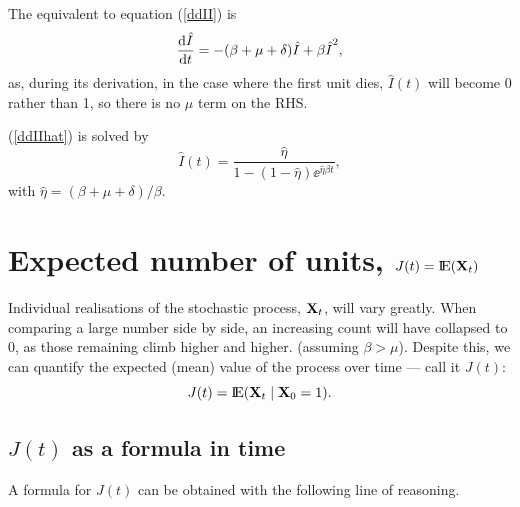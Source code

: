 The equivalent to equation (\ref{ddII}) is
\begin{equation}
\label{ddIIhat}
\displaystyle\frac{{\rm d} \hat I}{{\rm d} t} =  -(\beta + \mu + \delta)\hat I + \beta {\hat I}^2,
\end{equation}
as, during its derivation, in the case where the first unit dies, $\hat I(t)$ will become 0 rather than 1, so there is no $\mu$ term on the RHS.

(\ref{ddIIhat}) is solved by
$$\hat I(t) = \frac{\hat\eta}{1 - (1-\hat\eta)\ee^{\hat\eta\beta t}}, $$
with $\hat\eta = (\beta + \mu + \delta)/\beta$.











\section{Expected number of units,  $J(t) = {\rm I}\!{\rm E}({{\bf X}_t})$}

Individual realisations of the stochastic process, ${{\bf X}_t}$, will vary greatly. When comparing a large number side by side, an increasing count will have collapsed to 0, as those remaining climb higher and higher. (assuming $\beta > \mu$). Despite this, we can quantify the expected (mean) value of the process over time --- call it $J(t)$: 
$$J(t) = {\rm I}\!{\rm E}({{\bf X}_t}\;|\;{\bf X}_0=1).$$

\subsection{$J(t)$ as a formula in time}
A formula for $J(t)$ can be obtained with the following line of reasoning. 


